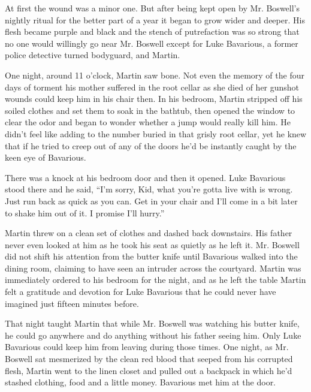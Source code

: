 At first the wound was a minor one. But after being kept open by
Mr. Boswell's nightly ritual for the better part of a year it began
to grow wider and deeper. His flesh became purple and black and the
stench of putrefaction was so strong that no one would willingly go
near Mr. Boswell except for Luke Bavarious, a former police
detective turned bodyguard, and Martin.



One night, around 11 o'clock, Martin saw bone. Not even the memory
of the four days of torment his mother suffered in the root cellar
as she died of her gunshot wounds could keep him in his chair then.
In his bedroom, Martin stripped off his soiled clothes and set them
to soak in the bathtub, then opened the window to clear the odor
and began to wonder whether a jump would really kill him. He didn't
feel like adding to the number buried in that grisly root cellar,
yet he knew that if he tried to creep out of any of the doors he'd
be instantly caught by the keen eye of Bavarious.



There was a knock at his bedroom door and then it opened. Luke
Bavarious stood there and he said, ``I'm sorry, Kid, what you're
gotta live with is wrong. Just run back as quick as you can. Get in
your chair and I'll come in a bit later to shake him out of it. I
promise I'll hurry.''



Martin threw on a clean set of clothes and dashed back downstairs.
His father never even looked at him as he took his seat as quietly
as he left it. Mr. Boswell did not shift his attention from the
butter knife until Bavarious walked into the dining room, claiming
to have seen an intruder across the courtyard. Martin was
immediately ordered to his bedroom for the night, and as he left
the table Martin felt a gratitude and devotion for Luke Bavarious
that he could never have imagined just fifteen minutes
before.



That night taught Martin that while Mr. Boswell was watching his
butter knife, he could go anywhere and do anything without his
father seeing him. Only Luke Bavarious could keep him from leaving
during those times. One night, as Mr. Boswell sat mesmerized by the
clean red blood that seeped from his corrupted flesh, Martin went
to the linen closet and pulled out a backpack in which he'd stashed
clothing, food and a little money. Bavarious met him at the
door.



